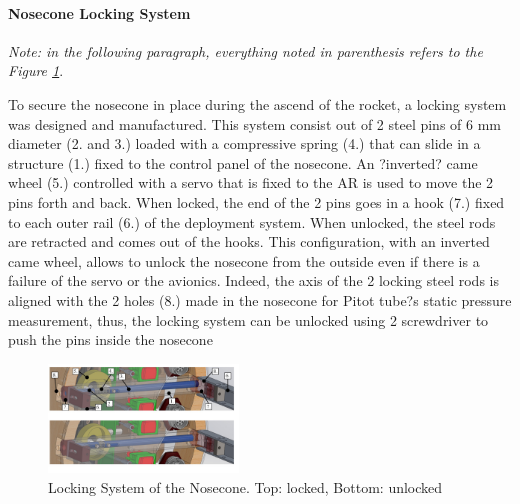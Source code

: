 \paragraph{Nosecone Locking System}
 \hfill \break
\textit{Note: in the following paragraph, everything noted in parenthesis refers to the Figure \ref{f:av_locking_sys}}.

To secure the nosecone in place during the ascend of the rocket, a locking system was designed and manufactured. This system consist out of 2 steel pins of 6 mm diameter (2. and 3.) loaded with a compressive spring (4.) that can slide in a structure (1.) fixed to the control panel of the nosecone. An ?inverted? came wheel (5.) controlled with a servo that is fixed to the AR is used to move the 2 pins forth and back. When locked, the end of the 2 pins goes in a hook (7.) fixed to each outer rail (6.) of the
deployment system. When unlocked, the steel rods are retracted and comes out of the hooks. 
This configuration, with an inverted came wheel, allows to unlock the nosecone from the outside even if there is a failure of the servo or the avionics. Indeed, the axis of the 2 locking steel rods is aligned with the 2 holes (8.) made in the nosecone for Pitot tube?s static pressure measurement, thus, the locking system can be unlocked using 2 screwdriver to push the pins inside the nosecone

  \begin{figure}[h!]
 	\centering
        \includegraphics[width=0.45\textwidth]{img/AV_FIG_CAD_lockingsystem_22.jpg}
        \caption{Locking System of the Nosecone. Top: locked, Bottom: unlocked}
        \label{f:av_locking_sys}
 \end{figure}

